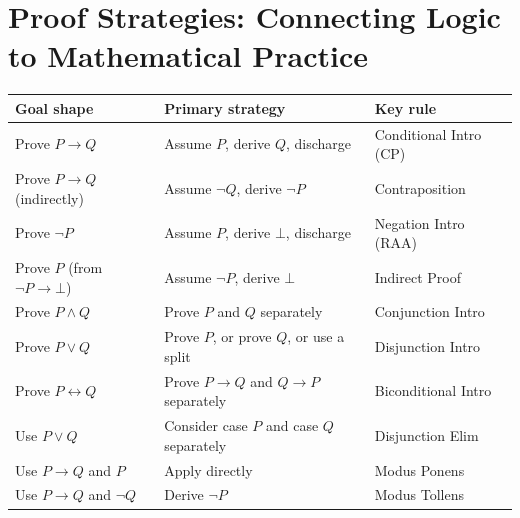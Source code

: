 
\section{Proof Strategies: Connecting Logic to Mathematical Practice}

\begin{tcolorbox}[colback=gray!6, colframe=gray!40, arc=2pt,
  left=6pt, right=6pt, top=4pt, bottom=4pt,
  title={\small\textbf{Proof Strategy Guide — Quick Reference}},
  fonttitle=\small\bfseries]
\small
\begin{tabular}{l l l}
\toprule
\textbf{Goal shape} & \textbf{Primary strategy} & \textbf{Key rule} \\
\midrule
Prove $P \to Q$              & Assume $P$, derive $Q$, discharge          & Conditional Intro (CP) \\
Prove $P \to Q$ (indirectly) & Assume $\neg Q$, derive $\neg P$           & Contraposition \\
Prove $\neg P$               & Assume $P$, derive $\bot$, discharge       & Negation Intro (RAA) \\
Prove $P$ (from $\neg P \to \bot$) & Assume $\neg P$, derive $\bot$         & Indirect Proof \\
Prove $P \wedge Q$           & Prove $P$ and $Q$ separately               & Conjunction Intro \\
Prove $P \vee Q$             & Prove $P$, or prove $Q$, or use a split    & Disjunction Intro \\
Prove $P \leftrightarrow Q$  & Prove $P \to Q$ and $Q \to P$ separately   & Biconditional Intro \\
Use $P \vee Q$               & Consider case $P$ and case $Q$ separately  & Disjunction Elim \\
Use $P \to Q$ and $P$        & Apply directly                             & Modus Ponens \\
Use $P \to Q$ and $\neg Q$   & Derive $\neg P$                            & Modus Tollens \\
\bottomrule
\end{tabular}
\end{tcolorbox}

\vspace{1em}

